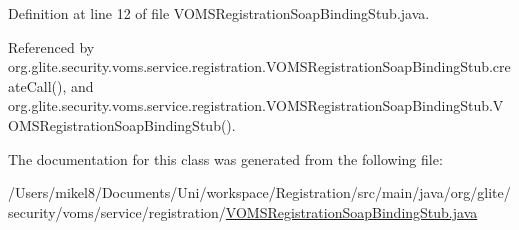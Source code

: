 Definition at line 12 of file VOMSRegistrationSoapBindingStub.java.



Referenced by org.glite.security.voms.service.registration.VOMSRegistrationSoapBindingStub.createCall(), and org.glite.security.voms.service.registration.VOMSRegistrationSoapBindingStub.VOMSRegistrationSoapBindingStub().



The documentation for this class was generated from the following file:\begin{DoxyCompactItemize}
\item 
/Users/mikel8/Documents/Uni/workspace/Registration/src/main/java/org/glite/security/voms/service/registration/\hyperlink{VOMSRegistrationSoapBindingStub_8java}{VOMSRegistrationSoapBindingStub.java}\end{DoxyCompactItemize}
